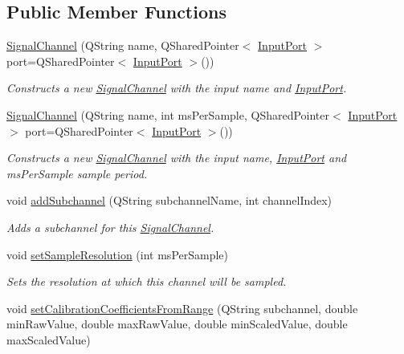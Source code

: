 \subsection*{Public Member Functions}
\begin{DoxyCompactItemize}
\item 
\hyperlink{class_picto_1_1_signal_channel_afd9b6db73405a692074553032f1ca33c}{Signal\-Channel} (Q\-String name, Q\-Shared\-Pointer$<$ \hyperlink{class_picto_1_1_input_port}{Input\-Port} $>$ port=Q\-Shared\-Pointer$<$ \hyperlink{class_picto_1_1_input_port}{Input\-Port} $>$())
\begin{DoxyCompactList}\small\item\em Constructs a new \hyperlink{class_picto_1_1_signal_channel}{Signal\-Channel} with the input name and \hyperlink{class_picto_1_1_input_port}{Input\-Port}. \end{DoxyCompactList}\item 
\hyperlink{class_picto_1_1_signal_channel_a76034e92addacd628ee3d3c7226f5df3}{Signal\-Channel} (Q\-String name, int ms\-Per\-Sample, Q\-Shared\-Pointer$<$ \hyperlink{class_picto_1_1_input_port}{Input\-Port} $>$ port=Q\-Shared\-Pointer$<$ \hyperlink{class_picto_1_1_input_port}{Input\-Port} $>$())
\begin{DoxyCompactList}\small\item\em Constructs a new \hyperlink{class_picto_1_1_signal_channel}{Signal\-Channel} with the input name, \hyperlink{class_picto_1_1_input_port}{Input\-Port} and ms\-Per\-Sample sample period. \end{DoxyCompactList}\item 
void \hyperlink{class_picto_1_1_signal_channel_abfe16a2da824414da1ed01ae72604077}{add\-Subchannel} (Q\-String subchannel\-Name, int channel\-Index)
\begin{DoxyCompactList}\small\item\em Adds a subchannel for this \hyperlink{class_picto_1_1_signal_channel}{Signal\-Channel}. \end{DoxyCompactList}\item 
void \hyperlink{class_picto_1_1_signal_channel_a50f252249632b01ab624ae92e5db6c86}{set\-Sample\-Resolution} (int ms\-Per\-Sample)
\begin{DoxyCompactList}\small\item\em Sets the resolution at which this channel will be sampled. \end{DoxyCompactList}\item 
void \hyperlink{class_picto_1_1_signal_channel_a4db4932285b2f8c3fb4a3e95c6c21193}{set\-Calibration\-Coefficients\-From\-Range} (Q\-String subchannel, double min\-Raw\-Value, double max\-Raw\-Value, double min\-Scaled\-Value, double max\-Scaled\-Value)

\end{DoxyCompactItemize}
